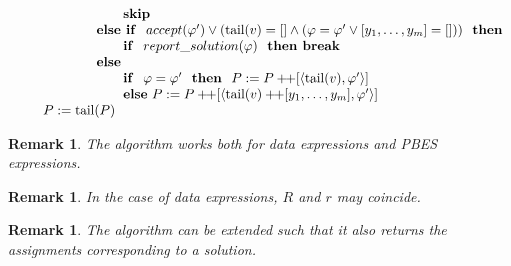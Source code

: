 \documentclass{article}
\newtheorem{remark}[theorem]{Remark}
\newcommand{\concat}{\ensuremath{+\!\!+}}
\begin{document}
\[\begin{tabular}{l}
\qquad \qquad \qquad \qquad \textbf{skip } \\
\qquad \qquad \qquad \textbf{else if } $accept(\varphi')
\vee (\mathrm{tail}(v) = [] \wedge (\varphi = \varphi' \vee [y_1,\ldots ,y_m] = [])) 
$ \textbf{ then} \\
\qquad \qquad \qquad \qquad \textbf{if } $report\_solution(\varphi)$ \textbf{ then break} \\
\qquad \qquad \qquad \textbf{else} \\
\qquad \qquad \qquad \qquad \textbf{if } $\varphi = \varphi'$ \textbf{ then }
$P:=P\concat\lbrack \left\langle \mathrm{tail}(v),\varphi'\right\rangle ]$ \\
\qquad \qquad \qquad \qquad \textbf{else}
$P:=P\concat\lbrack \left\langle \mathrm{tail}(v) \concat [y_{1},\ldots ,y_{m}],\varphi'\right\rangle ]$ \\
\qquad $P:=\mathrm{tail}(P)$
\end{tabular}
\]

\begin{remark}
The algorithm works both for data expressions and PBES expressions.
\end{remark}

\begin{remark}
In the case of data expressions, $R$ and $r$ may coincide.%
\end{remark}

\begin{remark}
The algorithm can be extended such that it also returns the assignments
corresponding to a solution.
\end{remark}
\end{document}
